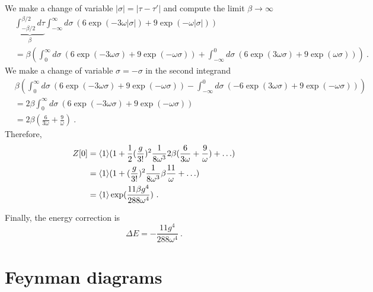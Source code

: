     We make a change of variable $|\sigma| = |\tau - \tau'|$ and compute the limit $\beta \rightarrow \infty$
    \begin{equation*}
    \begin{aligned}
        & \underbrace{\int_{- \beta / 2}^{\beta/2} d\tau}_\beta \int_{-\infty}^{\infty} d\sigma ~ (6 \exp(- 3 \omega |\sigma|) + 9 \exp(- \omega |\sigma|)) \\ & = \beta (\int_{0}^{\infty} d\sigma ~ (6 \exp(- 3 \omega \sigma) + 9 \exp(- \omega \sigma))  + \int_{-\infty}^{0} d\sigma ~ (6 \exp(3 \omega \sigma) + 9 \exp(\omega \sigma)))  ~.
    \end{aligned}
    \end{equation*}
    We make a change of variable $\sigma = - \sigma$ in the second integrand 
    \begin{equation*}
    \begin{aligned}
        & \beta (\int_{0}^{\infty} d\sigma ~ (6 \exp(- 3 \omega \sigma) + 9 \exp(- \omega \sigma)) - \int_{-\infty}^{0} d\sigma ~ ( -6 \exp(3 \omega \sigma) + 9 \exp(- \omega \sigma))) \\ & = 2 \beta \int_{0}^{\infty} d\sigma ~ (6 \exp(- 3 \omega \sigma) + 9 \exp(- \omega \sigma)) \\ & = 2 \beta (\frac{6}{3 \omega} + \frac{9}{\omega}) ~.
    \end{aligned}
    \end{equation*}
    Therefore,
    \begin{equation*}
    \begin{aligned}
        Z[0] & = \langle1\rangle ( 1 + \frac{1}{2} (\frac{g}{3!})^2 \frac{1}{8 \omega^3}2 \beta (\frac{6}{3 \omega} + \frac{9}{\omega}) + \ldots) \\ & = \langle1\rangle ( 1 +  (\frac{g}{3!})^2 \frac{1}{8 \omega^3} \beta \frac{11}{\omega}  + \ldots) \\ & = \langle1\rangle \exp(\frac{11 \beta g^4}{288 \omega^4} )~.
    \end{aligned}
    \end{equation*}

    Finally, the energy correction is 
    \begin{equation*}
        \Delta E = - \frac{11 g^4}{288 \omega^4} ~.
    \end{equation*}

    \section{Feynman diagrams}


